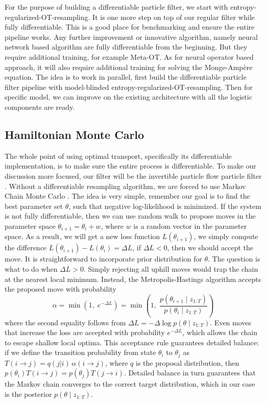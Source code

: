 \documentclass{article}
\begin{document}
For the purpose of building a differentiable particle filter, we start with entropy-regularized-OT-resampling. It is one more step on top of our regular filter while fully differentiable. This is a good place for benchmarking and ensure the entire pipeline works. Any further improvement or innovative algorithm, namely neural network based algorithm are fully differentiable from the beginning. But they require additional training, for example Meta-OT. As for neural operator based approach, it will also require additional training for solving the Monge-Ampère equation. The idea is to work in parallel, first build the differentiable particle filter pipeline with model-blinded entropy-regularized-OT-resampling. Then for specific model, we can improve on the existing architecture with all the logistic components are ready. 




\subsection{Hamiltonian Monte Carlo}
The whole point of using optimal transport, specifically its differentiable implementation, is to make sure the entire process is differentiable. To make our discussion more focused, our filter will be the invertible particle flow particle filter \cite{Li-Particle-Filtering-2017}. Without a differentiable resampling algorithm, we are forced to use Markov Chain Monte Carlo \cite{Andrieu2010}. The idea is very simple, remember our goal is to find the best parameter set ${\theta}$, such that negative log-likelihood is minimized. If the system is not fully differentiable, then we can use random walk to propose moves in the parameter space $\theta_{i+1}=\theta_{i}+ w$, where $w$ is a random vector in the parameter space. As a result, we will get a new loss function $L(\theta_{i+1})$, we simply compute the difference $L(\theta_{i+1})-L(\theta_{i})=\Delta L$, if $\Delta L<0$, then we should accept the move. It is straightforward to incorporate prior distribution for $\theta$. The question is what to do when $\Delta L > 0$. Simply rejecting all uphill moves would trap the chain at the nearest local minimum. Instead, the Metropolis-Hastings algorithm\cite{Metropolis1953} accepts the proposed move with probability
\begin{equation}
    \alpha = \min\!\left(1,\; e^{-\Delta L}\right) = \min\!\left(1,\; \frac{p(\theta_{i+1} \mid z_{1:T})}{p(\theta_i \mid z_{1:T})}\right)
\end{equation}
where the second equality follows from $\Delta L = -\Delta \log p(\theta \mid z_{1:T})$. Even moves that increase the loss are accepted with probability $e^{-\Delta L}$, which allows the chain to escape shallow local optima. This acceptance rule guarantees detailed balance: if we define the transition probability from state $\theta_i$ to $\theta_j$ as $T(i\to j) = q(j|i)\,\alpha(i\to j)$, where $q$ is the proposal distribution, then $p(\theta_i) T(i\to j) = p(\theta_j) T(j\to i)$. Detailed balance in turn guarantees that the Markov chain converges to the correct target distribution, which in our case is the posterior $p(\theta \mid z_{1:T})$\cite{Neal-2012-MCMC-Hamiltonian-Dynamics-ARXIV-1206-1901v1}.
\end{document}
